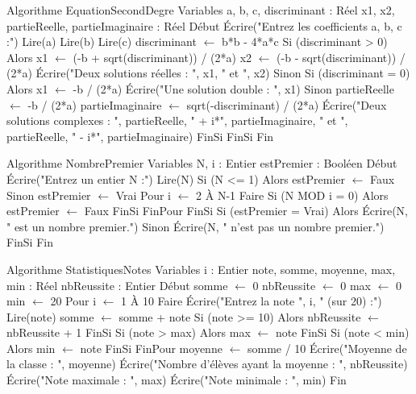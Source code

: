 \begin{algo}
Algorithme EquationSecondDegre
Variables
    a, b, c, discriminant : Réel
    x1, x2, partieReelle, partieImaginaire : Réel
Début
    Écrire("Entrez les coefficients a, b, c :")
    Lire(a)
    Lire(b)
    Lire(c)
    discriminant $\leftarrow$ b*b - 4*a*c
    Si (discriminant > 0) Alors
        x1 $\leftarrow$ (-b + sqrt(discriminant)) / (2*a)
        x2 $\leftarrow$ (-b - sqrt(discriminant)) / (2*a)
        Écrire("Deux solutions réelles : ", x1, " et ", x2)
    Sinon
        Si (discriminant = 0) Alors
            x1 $\leftarrow$ -b / (2*a)
            Écrire("Une solution double : ", x1)
        Sinon
            partieReelle $\leftarrow$ -b / (2*a)
            partieImaginaire $\leftarrow$ sqrt(-discriminant) / (2*a)
            Écrire("Deux solutions complexes : ", partieReelle, " + i*", partieImaginaire, " et ", partieReelle, " - i*", partieImaginaire)
        FinSi
    FinSi
Fin
\end{algo}

\begin{algo}
Algorithme NombrePremier
Variables
    N, i : Entier
    estPremier : Booléen
Début
    Écrire("Entrez un entier N :")
    Lire(N)
    Si (N <= 1) Alors
        estPremier $\leftarrow$ Faux
    Sinon
        estPremier $\leftarrow$ Vrai
        Pour i $\leftarrow$ 2 À N-1 Faire
            Si (N MOD i = 0) Alors
                estPremier $\leftarrow$ Faux
            FinSi
        FinPour
    FinSi
    Si (estPremier = Vrai) Alors
        Écrire(N, " est un nombre premier.")
    Sinon
        Écrire(N, " n'est pas un nombre premier.")
    FinSi
Fin
\end{algo}

\begin{algo}
Algorithme StatistiquesNotes
Variables
    i : Entier
    note, somme, moyenne, max, min : Réel
    nbReussite : Entier
Début
    somme $\leftarrow$ 0
    nbReussite $\leftarrow$ 0
    max $\leftarrow$ 0
    min $\leftarrow$ 20
    Pour i $\leftarrow$ 1 À 10 Faire
        Écrire("Entrez la note ", i, " (sur 20) :")
        Lire(note)
        somme $\leftarrow$ somme + note
        Si (note >= 10) Alors
            nbReussite $\leftarrow$ nbReussite + 1
        FinSi
        Si (note > max) Alors
            max $\leftarrow$ note
        FinSi
        Si (note < min) Alors
            min $\leftarrow$ note
        FinSi
    FinPour
    moyenne $\leftarrow$ somme / 10
    Écrire("Moyenne de la classe : ", moyenne)
    Écrire("Nombre d'élèves ayant la moyenne : ", nbReussite)
    Écrire("Note maximale : ", max)
    Écrire("Note minimale : ", min)
Fin
\end{algo}

